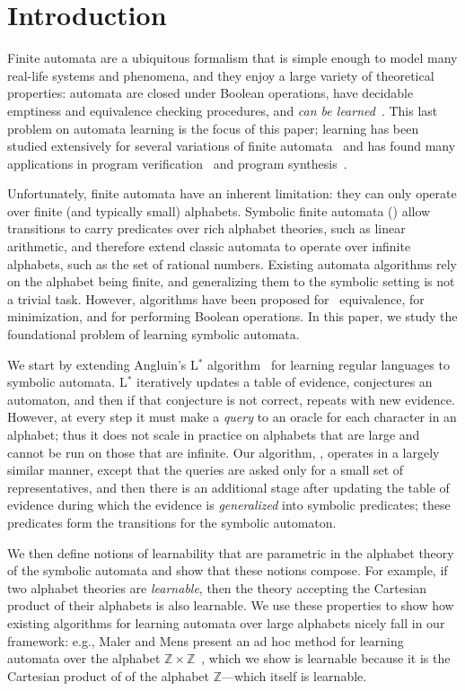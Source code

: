 \section{Introduction}

Finite automata are a ubiquitous formalism that is simple enough to model many real-life systems and phenomena,
and they enjoy a large variety of theoretical properties:
automata are closed under Boolean operations,
have decidable emptiness and equivalence checking procedures, and
\emph{can be learned}~\cite{angluin87}.
This last problem on automata learning is the focus of this paper;
learning has been studied extensively for several variations of finite automata~\cite{Garcia08,Angluin15}
and has found many applications in program verification~\cite{Alur05} and
program synthesis~\cite{Yuan14}.

Unfortunately, finite automata have an inherent limitation: 
they can only operate over finite (and typically small) alphabets.
Symbolic finite  automata (\SFA) allow transitions to carry predicates over
rich alphabet theories, such as linear arithmetic, and therefore extend
classic automata to operate over infinite alphabets, such as
the set of rational numbers. 
Existing automata algorithms rely
on the alphabet being finite, and generalizing them to the symbolic
setting is not a trivial task. However, 
algorithms have been proposed for \SFA\ equivalence, for minimization, and for performing Boolean operations.
In this paper, we study the foundational problem of learning symbolic automata.

We start by
extending Angluin's L$^*$
algorithm~\cite{angluin87} for learning regular languages to symbolic automata.
L$^*$ iteratively updates a table of evidence, conjectures an automaton,
and then if that conjecture is not correct, repeats with new evidence.
However, at every step it must make a \emph{query} to an oracle
for each character in an alphabet;
thus it does not scale in practice on alphabets that are large
and cannot be run on those that are infinite.
Our algorithm, \alg, operates in a largely similar manner,
except that the queries are asked only for a small set of
representatives,
and then there is an additional stage after updating the table of evidence
during which the evidence is \emph{generalized} into symbolic predicates;
these predicates form the transitions for the symbolic automaton.

We then define notions of learnability that are parametric in the alphabet theory
of the symbolic automata and show that these notions compose.
For example, if two alphabet theories are \emph{learnable},
then the theory accepting the Cartesian product of their alphabets is also learnable.
We use these properties to show
how existing algorithms for learning automata over large alphabets nicely fall in our framework:
e.g., Maler and Mens present an ad hoc method for learning
automata over the alphabet
$\mathbb{Z} \times \mathbb{Z}$~\cite{mens15},
which we show is learnable because it is the Cartesian product of
of the alphabet $\mathbb{Z}$---which itself is learnable.

